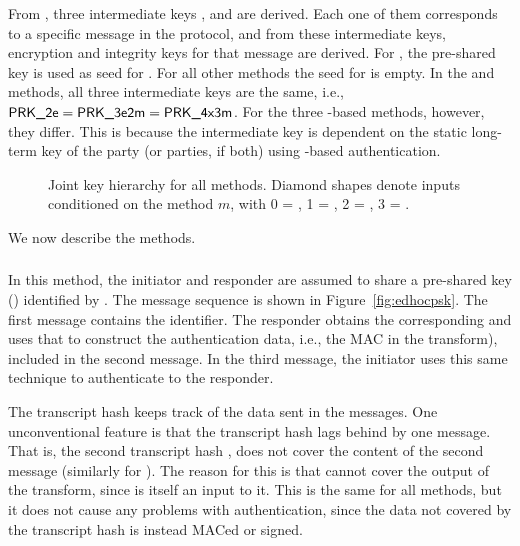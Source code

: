 From \mGxy{}, three intermediate keys \mPRKtwo, \mPRKthree{} and
\mPRKthree{} are derived.
%
Each one of them corresponds to a specific message in the protocol, and from
these intermediate keys, encryption and integrity keys for that message are
derived.
%
For \mPskPsk{}, the pre-shared key is used as seed for \mPRKtwo.
%
For all other methods the seed for \mPRKtwo{} is empty.
%
In the \mPskPsk{} and \mSigSig{} methods, all three intermediate keys
are the same, i.e., $\textsf{PRK\_2e}{} = \textsf{PRK\_3e2m}{} = \textsf{PRK\_4x3m}$.
%
For the three \mStat-based methods, however, they differ.
%
This is because the intermediate key \mPRKthree{} is dependent on the static
long-term key of the party (or parties, if both) using \mStat{}-based
authentication.
%

\begin{figure}[!h]
\scalebox{.75}{

}
\caption{Joint key hierarchy for all methods.
Diamond shapes denote inputs conditioned on the method $m$,
with 0 = \mSigSig, 1 = \mSigStat, 2 = \mStatSig, 3 = \mStatStat.}
\label{fig:kdfdiagram}
\end{figure}

We now describe the \mEdhoc{} methods.
%

\spacehack
\subsubsection{\mPskPsk{}}
In this method, the initiator and responder are assumed to share a pre-shared
key (\mPsk) identified by \mIDPsk.
%
The message sequence is shown in Figure~\ref{fig:edhocpsk}.
%
The first message contains the \mIDPsk{} identifier.
%
The responder obtains the corresponding \mPsk{} and uses that to construct the
authentication data, i.e., the MAC in the \mAead{} transform), included in
the second message.
%
In the third message, the initiator uses this same technique to authenticate
to the responder.
%

The transcript hash \mTH{} keeps track of the data sent in the messages.
%
One unconventional feature is that the transcript hash lags behind by one
message.
%
That is, the second transcript hash \mTHtwo{}, does not cover the content of
the second message (similarly for \mTHthree).
%
The reason for this is that \mTHtwo{} cannot cover the output of the
\mAead{} transform, since \mTHtwo{} is itself an input to it.
%
This is the same for all methods, but it does not cause any problems with
authentication, since the data not covered by the transcript hash is
instead MACed or signed.
%

